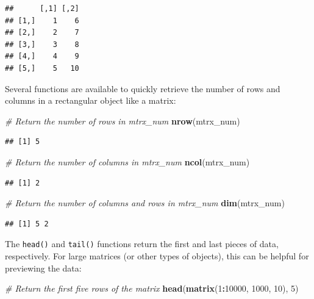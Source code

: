 \documentclass[]{book}
\newenvironment{Shaded}{\begin{snugshade}}{\end{snugshade}}
\newcommand{\CommentTok}[1]{\textcolor[rgb]{0.56,0.35,0.01}{\textit{#1}}}
\newcommand{\DecValTok}[1]{\textcolor[rgb]{0.00,0.00,0.81}{#1}}
\newcommand{\KeywordTok}[1]{\textcolor[rgb]{0.13,0.29,0.53}{\textbf{#1}}}
\newcommand{\NormalTok}[1]{#1}
\newcommand{\OperatorTok}[1]{\textcolor[rgb]{0.81,0.36,0.00}{\textbf{#1}}}
\begin{document}
\begin{verbatim}
##      [,1] [,2]
## [1,]    1    6
## [2,]    2    7
## [3,]    3    8
## [4,]    4    9
## [5,]    5   10
\end{verbatim}

Several functions are available to quickly retrieve the number of rows and columns in a rectangular object like a matrix:

\begin{Shaded}
\begin{Highlighting}[]
\CommentTok{# Return the number of rows in mtrx_num}
\KeywordTok{nrow}\NormalTok{(mtrx_num)}
\end{Highlighting}
\end{Shaded}

\begin{verbatim}
## [1] 5
\end{verbatim}

\begin{Shaded}
\begin{Highlighting}[]
\CommentTok{# Return the number of columns in mtrx_num}
\KeywordTok{ncol}\NormalTok{(mtrx_num)}
\end{Highlighting}
\end{Shaded}

\begin{verbatim}
## [1] 2
\end{verbatim}

\begin{Shaded}
\begin{Highlighting}[]
\CommentTok{# Return the number of columns and rows in mtrx_num}
\KeywordTok{dim}\NormalTok{(mtrx_num)}
\end{Highlighting}
\end{Shaded}

\begin{verbatim}
## [1] 5 2
\end{verbatim}

The \texttt{head()} and \texttt{tail()} functions return the first and last pieces of data, respectively. For large matrices (or other types of objects), this can be helpful for previewing the data:

\begin{Shaded}
\begin{Highlighting}[]
\CommentTok{# Return the first five rows of the matrix}
\KeywordTok{head}\NormalTok{(}\KeywordTok{matrix}\NormalTok{(}\DecValTok{1}\OperatorTok{:}\DecValTok{10000}\NormalTok{, }\DecValTok{1000}\NormalTok{, }\DecValTok{10}\NormalTok{), }\DecValTok{5}\NormalTok{)}
\end{Highlighting}
\end{Shaded}
\end{document}
